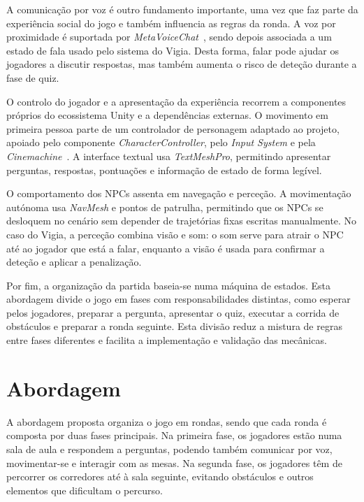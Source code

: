 A comunicação por voz é outro fundamento importante, uma vez que faz parte da experiência social do jogo e também influencia as regras da ronda. A voz por proximidade é suportada por \textit{MetaVoiceChat}~\cite{Metater2024}, sendo depois associada a um estado de fala usado pelo sistema do Vigia. Desta forma, falar pode ajudar os jogadores a discutir respostas, mas também aumenta o risco de deteção durante a fase de quiz.

O controlo do jogador e a apresentação da experiência recorrem a componentes próprios do ecossistema Unity e a dependências externas. O movimento em primeira pessoa parte de um controlador de personagem adaptado ao projeto, apoiado pelo componente \textit{CharacterController}, pelo \textit{Input System} e pela \textit{Cinemachine}~\cite{UnityCinemachine2024}. A interface textual usa \textit{TextMeshPro}, permitindo apresentar perguntas, respostas, pontuações e informação de estado de forma legível.

O comportamento dos NPCs assenta em navegação e perceção. A movimentação autónoma usa \textit{NavMesh} e pontos de patrulha, permitindo que os NPCs se desloquem no cenário sem depender de trajetórias fixas escritas manualmente. No caso do Vigia, a perceção combina visão e som: o som serve para atrair o NPC até ao jogador que está a falar, enquanto a visão é usada para confirmar a deteção e aplicar a penalização.

Por fim, a organização da partida baseia-se numa máquina de estados. Esta abordagem divide o jogo em fases com responsabilidades distintas, como esperar pelos jogadores, preparar a pergunta, apresentar o quiz, executar a corrida de obstáculos e preparar a ronda seguinte. Esta divisão reduz a mistura de regras entre fases diferentes e facilita a implementação e validação das mecânicas.


\section{Abordagem}
\label{sec:abordagem}

A abordagem proposta organiza o jogo em rondas, sendo que cada ronda é composta por duas fases principais. Na primeira fase, os jogadores estão numa sala de aula e respondem a perguntas, podendo também comunicar por voz, movimentar-se e interagir com as mesas. Na segunda fase, os jogadores têm de percorrer os corredores até à sala seguinte, evitando obstáculos e outros elementos que dificultam o percurso.


